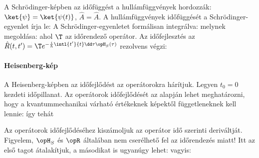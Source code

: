     A Schrödinger-képben az időfüggést a hullámfüggvények hordozzák: $\ket{\psi}=\ket{\psi(t)}$, $\hat{A}=\hat{A}$.
   A hullámfüggvények időfüggését a Schrödinger-egyenlet írja le:
    A Schrödinger-egyenletet formálisan integrálva:
    melynek megoldása:
    ahol $\T$ az időrendező operátor.
   Az időfejlesztés az $\hat{R}(t,t')=\T e^{-\frac{i}{\hbar}\intl{t'}{t}\dd \tau \opH_S(\tau)}$ rezolvens végzi:
    
   \paragraph{Heisenberg-kép}
   
    A Heisenberg-képben az időfejlődést az operátorokra hárítjuk.
   Legyen $t_0=0$ kezdeti időpillanat.
   Az operátorok időfejlődését az alapján lehet meghatározni, hogy a kvantummechanikai várható értékeknek képektől függetleneknek kell lennie:
    így tehát
    
    Az operátorok időfejlődéséhez kiszámoljuk az operátor idő szerinti deriváltját.
   Figyelem, $\opH_S$ és $\opR$ általában nem cserélhető fel az időrendezés miatt!
    Itt az első tagot átalakítjuk, a másodikat is ugyanúgy lehet:
    vagyis:
   
